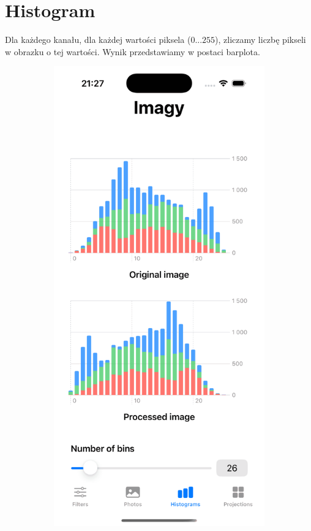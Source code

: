 \documentclass[a4paper]{article}
\begin{document}
\section{Histogram}

Dla każdego kanału, dla każdej wartości piksela ($0...255$), zliczamy liczbę pikseli w obrazku o tej wartości. Wynik przedstawiamy w postaci barplota.

\begin{figure}[H]
    \centering
    \begin{subfigure}{0.2\textwidth}
        \centering
        \includegraphics[width=\linewidth]{images/histogram_26.png}

\end{subfigure}
\end{figure}
\end{document}
